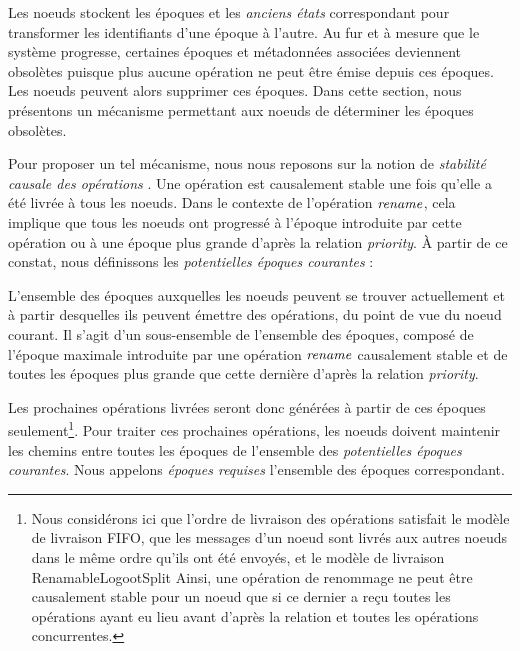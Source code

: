 \label{sec:gc-mechanism}

Les noeuds stockent les époques et les \emph{anciens états} correspondant pour transformer les identifiants d'une époque à l'autre.
Au fur et à mesure que le système progresse, certaines époques et métadonnées associées deviennent obsolètes puisque plus aucune opération ne peut être émise depuis ces époques.
Les noeuds peuvent alors supprimer ces époques.
Dans cette section, nous présentons un mécanisme permettant aux noeuds de déterminer les époques obsolètes.

Pour proposer un tel mécanisme, nous nous reposons sur la notion de \emph{stabilité causale des opérations} \cite{10.1007/978-3-662-43352-2_11}.
Une opération est causalement stable une fois qu'elle a été livrée à tous les noeuds.
Dans le contexte de l'opération $\mathit{rename}$, cela implique que tous les noeuds ont progressé à l'époque introduite par cette opération ou à une époque plus grande d'après la relation \emph{priority}.
À partir de ce constat, nous définissons les \emph{potentielles époques courantes} :

\begin{definition}
  L'ensemble des époques auxquelles les noeuds peuvent se trouver actuellement et à partir desquelles ils peuvent émettre des opérations, du point de vue du noeud courant.
  Il s'agit d'un sous-ensemble de l'ensemble des époques, composé de l'époque maximale introduite par une opération $\mathit{rename}$ causalement stable et de toutes les époques plus grande que cette dernière d'après la relation \emph{priority}.
\end{definition}

Les prochaines opérations livrées seront donc générées à partir de ces époques seulement\footnote{
    Nous considérons ici que l'ordre de livraison des opérations satisfait le modèle de livraison FIFO, \ie que les messages d'un noeud sont livrés aux autres noeuds dans le même ordre qu'ils ont été envoyés, et le modèle de livraison RenamableLogootSplit 
    Ainsi, une opération de renommage ne peut être causalement stable pour un noeud que si ce dernier a reçu toutes les opérations ayant eu lieu avant d'après la relation \hb et toutes les opérations concurrentes.
}.
Pour traiter ces prochaines opérations, les noeuds doivent maintenir les chemins entre toutes les époques de l'ensemble des \emph{potentielles époques courantes}.
Nous appelons \emph{époques requises} l'ensemble des époques correspondant.

